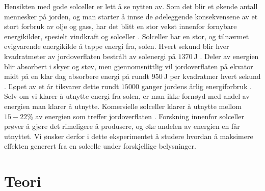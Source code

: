 \documentclass[%
 reprint,
 amsmath,amssymb,
 aps,
 norsk,
 booktabs
]{revtex4-1}
\begin{document}
Hensikten med gode solceller er lett å se nytten av. Som det blir et økende antall mennesker på jorden, og man starter å innse de ødeleggende konsekvensene av et stort forbruk av olje og gass, har det blitt en stor vekst innenfor fornybare energikilder, spesielt vindkraft og solceller \cite{oppgave}. Solceller har en stor, og tilnærmet evigvarende energikilde å tappe energi fra, solen. Hvert sekund blir hver kvadratmeter av jordoverflaten bestrålt av solenergi på $\SI{1370}{\joule}$ \cite{snl2}. Deler av energien blir absorbert i skyer og støv, men gjennomsnittlig vil jordoverflaten på ekvator midt på en klar dag absorbere energi på rundt $\SI{950}{\joule}$ per kvadratmer hvert sekund \cite{oppgave}. Iløpet av et år tilsvarer dette rundt $15 000$ ganger jordens årlig energiforbruk \cite{snl2}. Selv om vi klarer å utnytte energi fra solen, er man ikke fornøyd med andel av energien man klarer å utnytte. Komersielle solceller klarer å utnytte mellom $15-22\%$ av energien som treffer jordoverflaten \cite{oppgave}. Forskning innenfor solceller prøver å gjøre det rimeligere å produsere, og øke andelen av energien en får utnyttet. Vi ønsker derfor i dette eksperimentet å studere hvordan å maksimere effekten generert fra en solcelle under forskjellige belysninger.
\section{Teori}
\end{document}
